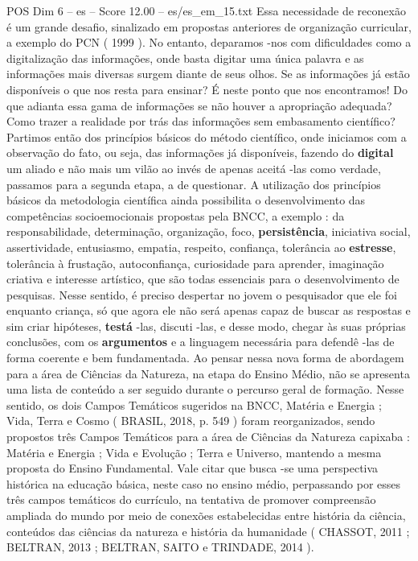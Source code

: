 \begin{textsample}{POS Dim 6 – es – Score 12.00 – es/es\_em\_15.txt}
Essa necessidade de reconexão é um grande desafio, sinalizado em propostas anteriores de organização curricular, a exemplo do PCN ( 1999 ).
No entanto, deparamos -nos com dificuldades como a digitalização das informações, onde basta digitar uma única palavra e as informações mais diversas surgem diante de seus olhos.
Se as informações já estão disponíveis o que nos resta para ensinar?
É neste ponto que nos encontramos!
Do que adianta essa gama de informações se não houver a apropriação adequada?
Como trazer a realidade por trás das informações sem embasamento científico?
Partimos então dos princípios básicos do método científico, onde iniciamos com a observação do fato, ou seja, das informações já disponíveis, fazendo do \textbf{digital} um aliado e não mais um vilão ao invés de apenas aceitá -las como verdade, passamos para a segunda etapa, a de questionar.
A utilização dos princípios básicos da metodologia científica ainda possibilita o desenvolvimento das competências socioemocionais propostas pela BNCC, a exemplo : da responsabilidade, determinação, organização, foco, \textbf{persistência}, iniciativa social, assertividade, entusiasmo, empatia, respeito, confiança, tolerância ao \textbf{estresse}, tolerância à frustação, autoconfiança, curiosidade para aprender, imaginação criativa e interesse artístico, que são todas essenciais para o desenvolvimento de pesquisas.
Nesse sentido, é preciso despertar no jovem o pesquisador que ele foi enquanto criança, só que agora ele não será apenas capaz de buscar as respostas e sim criar hipóteses, \textbf{testá} -las, discuti -las, e desse modo, chegar às suas próprias conclusões, com os \textbf{argumentos} e a linguagem necessária para defendê -las de forma coerente e bem fundamentada.
Ao pensar nessa nova forma de abordagem para a área de Ciências da Natureza, na etapa do Ensino Médio, não se apresenta uma lista de conteúdo a ser seguido durante o percurso geral de formação.
Nesse sentido, os dois Campos Temáticos sugeridos na BNCC, Matéria e Energia ; Vida, Terra e Cosmo ( BRASIL, 2018, p. 549 ) foram reorganizados, sendo propostos três Campos Temáticos para a área de Ciências da Natureza capixaba : Matéria e Energia ; Vida e Evolução ; Terra e Universo, mantendo a mesma proposta do Ensino Fundamental.
Vale citar que busca -se uma perspectiva histórica na educação básica, neste caso no ensino médio, perpassando por esses três campos temáticos do currículo, na tentativa de promover compreensão ampliada do mundo por meio de conexões estabelecidas entre história da ciência, conteúdos das ciências da natureza e história da humanidade ( CHASSOT, 2011 ; BELTRAN, 2013 ; BELTRAN, SAITO e TRINDADE, 2014 ).

\end{textsample}
